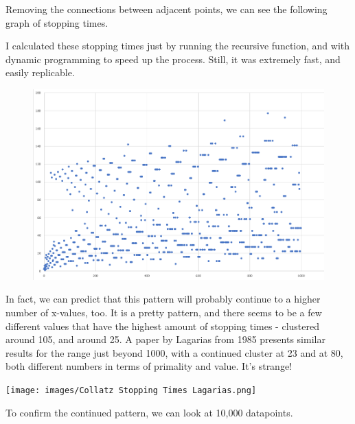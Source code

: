 \documentclass{article}
\theoremstyle{remark}
\theoremstyle{problem}
\numberwithin{problem}{subsection}
\numberwithin{Problem}{section}
\theoremstyle{definition}
\theoremstyle{definition}
\theoremstyle{definition}
\begin{document}
Removing the connections between adjacent points, we can see the following graph of stopping times.

I calculated these stopping times just by running the recursive function, and with dynamic programming to speed up the process. Still, it was extremely fast, and easily replicable.


\begin{figure}
\includegraphics[width = 0.7 \textwidth]{images/1000 Collatz Stopping Times.png}

\end{figure}

In fact, we can predict that this pattern will probably continue to a higher number of x-values, too. It is a pretty pattern, and there seems to be a few different values that have the highest amount of stopping times - clustered around 105, and around 25. A paper by Lagarias from 1985 presents similar results for the range just beyond 1000, with a continued cluster at 23 and at 80, both different numbers in terms of primality and value. It's strange!


\begin{centering}
    \texttt{[image: images/Collatz Stopping Times Lagarias.png]}
\end{centering}

To confirm the continued pattern, we can look at 10,000 datapoints. 
\end{document}
